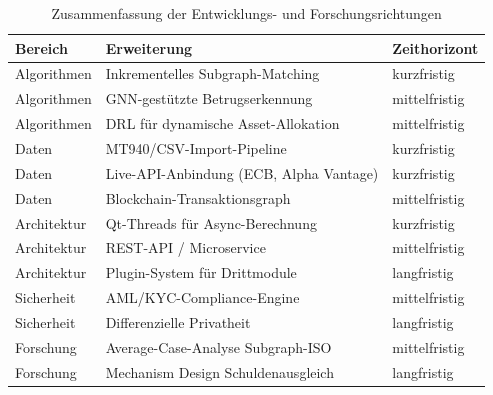 \documentclass[a4paper,12pt]{article}
\begin{document}
\begin{table}[h]
\centering
\caption{Zusammenfassung der Entwicklungs- und Forschungsrichtungen}
\label{tab:ausblick}
\small
\begin{tabular}{@{}lll@{}}
    \toprule
    \textbf{Bereich} & \textbf{Erweiterung} & \textbf{Zeithorizont} \\
    \midrule
    Algorithmen   & Inkrementelles Subgraph-Matching           & kurzfristig \\
    Algorithmen   & GNN-gestützte Betrugserkennung             & mittelfristig \\
    Algorithmen   & DRL für dynamische Asset-Allokation        & mittelfristig \\
    Daten         & MT940/CSV-Import-Pipeline                  & kurzfristig \\
    Daten         & Live-API-Anbindung (ECB, Alpha Vantage)    & kurzfristig \\
    Daten         & Blockchain-Transaktionsgraph               & mittelfristig \\
    Architektur   & Qt-Threads für Async-Berechnung            & kurzfristig \\
    Architektur   & REST-API / Microservice                    & mittelfristig \\
    Architektur   & Plugin-System für Drittmodule              & langfristig \\
    Sicherheit    & AML/KYC-Compliance-Engine                  & mittelfristig \\
    Sicherheit    & Differenzielle Privatheit                  & langfristig \\
    Forschung     & Average-Case-Analyse Subgraph-ISO          & mittelfristig \\
    Forschung     & Mechanism Design Schuldenausgleich         & langfristig \\
    \bottomrule
\end{tabular}
\end{table}
\end{document}
